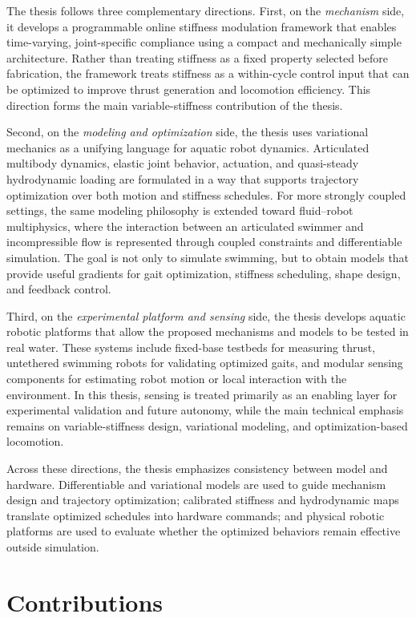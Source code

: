 The thesis follows three complementary directions. First, on the \emph{mechanism} side, it develops a programmable online stiffness modulation framework that enables time-varying, joint-specific compliance using a compact and mechanically simple architecture. Rather than treating stiffness as a fixed property selected before fabrication, the framework treats stiffness as a within-cycle control input that can be optimized to improve thrust generation and locomotion efficiency. This direction forms the main variable-stiffness contribution of the thesis.

Second, on the \emph{modeling and optimization} side, the thesis uses variational mechanics as a unifying language for aquatic robot dynamics. Articulated multibody dynamics, elastic joint behavior, actuation, and quasi-steady hydrodynamic loading are formulated in a way that supports trajectory optimization over both motion and stiffness schedules. For more strongly coupled settings, the same modeling philosophy is extended toward fluid--robot multiphysics, where the interaction between an articulated swimmer and incompressible flow is represented through coupled constraints and differentiable simulation. The goal is not only to simulate swimming, but to obtain models that provide useful gradients for gait optimization, stiffness scheduling, shape design, and feedback control.

Third, on the \emph{experimental platform and sensing} side, the thesis develops aquatic robotic platforms that allow the proposed mechanisms and models to be tested in real water. These systems include fixed-base testbeds for measuring thrust, untethered swimming robots for validating optimized gaits, and modular sensing components for estimating robot motion or local interaction with the environment. In this thesis, sensing is treated primarily as an enabling layer for experimental validation and future autonomy, while the main technical emphasis remains on variable-stiffness design, variational modeling, and optimization-based locomotion.

Across these directions, the thesis emphasizes consistency between model and hardware. Differentiable and variational models are used to guide mechanism design and trajectory optimization; calibrated stiffness and hydrodynamic maps translate optimized schedules into hardware commands; and physical robotic platforms are used to evaluate whether the optimized behaviors remain effective outside simulation.

\section{Contributions}
\label{sec:intro_contributions}

